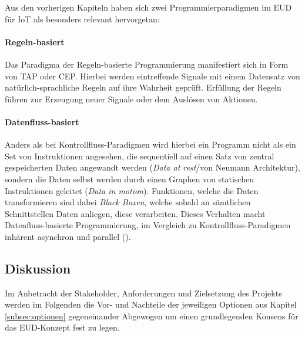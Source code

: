 Aus den vorherigen Kapiteln haben sich zwei Programmierparadigmen im \ac{EUD} für \ac{IoT} als besonders relevant hervorgetan:

\paragraph{Regeln-basiert} Das Paradigma der Regeln-basierte Programmierung manifestiert sich in Form von \ac{TAP} oder \ac{CEP}. Hierbei werden eintreffende Signale mit einem Datensatz von natürlich-sprachliche Regeln auf ihre Wahrheit geprüft. Erfüllung der Regeln führen zur Erzeugung neuer Signale oder dem Auslösen von Aktionen. 
\paragraph{Datenfluss-basiert} Anders als bei Kontrollfluss-Paradigmen wird hierbei ein Programm nicht als ein Set von Instruktionen angesehen, die sequentiell auf einen Satz von zentral gespeicherten Daten angewandt werden (\textit{Data at rest}/von Neumann Architektur), sondern die Daten selbst werden durch einen Graphen von statischen Instruktionen geleitet (\textit{Data in motion}). Funktionen, welche die Daten transformieren sind dabei \textit{Black Boxen}, welche sobald an sämtlichen Schnittstellen Daten anliegen, diese verarbeiten. Dieses Verhalten macht Datenfluss-basierte Programmierung, im Vergleich zu Kontrollfluss-Paradigmen inhärent asynchron und parallel (\cite{johnston2004advances}).

\subsection{Diskussion}
Im Anbetracht der Stakeholder, Anforderungen und Zielsetzung des Projekts werden im Folgenden die Vor- und Nachteile der jeweiligen Optionen aus Kapitel \ref{subsec:optionen} gegeneinander Abgewogen um einen grundlegenden Konsens für das \ac{EUD}-Konzept fest zu legen.

